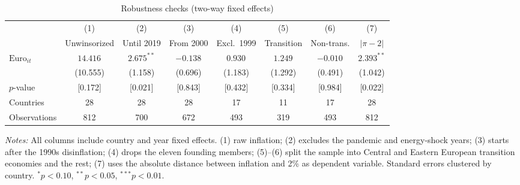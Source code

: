 \begin{table}[htbp]\centering\footnotesize\setlength{\tabcolsep}{4pt}
\caption{Robustness checks (two-way fixed effects)}\label{tab:rob}
\begin{tabular}{lccccccc}
\toprule
 & (1) & (2) & (3) & (4) & (5) & (6) & (7) \\
 & Unwinsorized & Until 2019 & From 2000 & Excl.\ 1999 & Transition & Non-trans. & $|\pi-2|$ \\
\midrule
$\text{Euro}_{it}$ & $14.416^{}$ & $2.675^{**}$ & $-0.138^{}$ & $0.930^{}$ & $1.249^{}$ & $-0.010^{}$ & $2.393^{**}$ \\
 & (10.555) & (1.158) & (0.696) & (1.183) & (1.292) & (0.491) & (1.042) \\
$p$-value & [0.172] & [0.021] & [0.843] & [0.432] & [0.334] & [0.984] & [0.022] \\[2pt]
\midrule
Countries & 28 & 28 & 28 & 17 & 11 & 17 & 28 \\
Observations & 812 & 700 & 672 & 493 & 319 & 493 & 812 \\
\bottomrule
\end{tabular}
\begin{minipage}{0.95\linewidth}\vspace{4pt}\footnotesize\textit{Notes:} All columns include country and year fixed effects. (1) raw inflation; (2) excludes the pandemic and energy-shock years; (3) starts after the 1990s disinflation; (4) drops the eleven founding members; (5)--(6) split the sample into Central and Eastern European transition economies and the rest; (7) uses the absolute distance between inflation and 2\% as dependent variable. Standard errors clustered by country. $^{*}p<0.10$, $^{**}p<0.05$, $^{***}p<0.01$.\end{minipage}
\end{table}